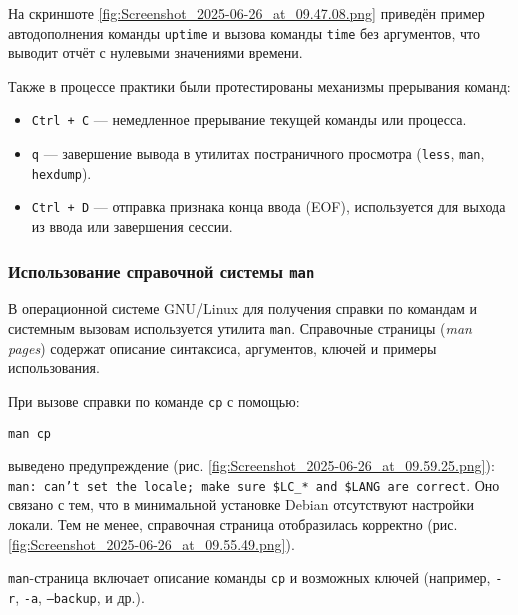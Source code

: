 На скриншоте \ref{fig:Screenshot_2025-06-26_at_09.47.08.png} приведён пример автодополнения команды \texttt{uptime} и вызова команды \texttt{time} без аргументов, что выводит отчёт с нулевыми значениями времени.


Также в процессе практики были протестированы механизмы прерывания команд:

\begin{itemize}
    \item \texttt{Ctrl + C} --- немедленное прерывание текущей команды или процесса.
    \item \texttt{q} --- завершение вывода в утилитах постраничного просмотра (\texttt{less}, \texttt{man}, \texttt{hexdump}).
    \item \texttt{Ctrl + D} --- отправка признака конца ввода (EOF), используется для выхода из ввода или завершения сессии.
\end{itemize}

\subsubsection*{Использование справочной системы \texttt{man}}

В операционной системе GNU/Linux для получения справки по командам и системным вызовам используется утилита \texttt{man}. Справочные страницы (\textit{man pages}) содержат описание синтаксиса, аргументов, ключей и примеры использования.

При вызове справки по команде \texttt{cp} с помощью:

\begin{verbatim}
man cp
\end{verbatim}

 выведено предупреждение (рис. \ref{fig:Screenshot_2025-06-26_at_09.59.25.png}):
\texttt{man: can't set the locale; make sure \$LC\_* and \$LANG are correct}.
Оно связано с тем, что в минимальной установке Debian отсутствуют настройки локали. Тем не менее, справочная страница отобразилась корректно (рис. \ref{fig:Screenshot_2025-06-26_at_09.55.49.png}).


\texttt{man}-страница включает описание команды \texttt{cp} и возможных ключей (например, \texttt{-r}, \texttt{-a}, \texttt{--backup}, и др.).

